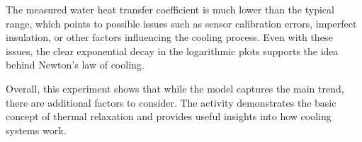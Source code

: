 \documentclass[12pt,a4paper]{report}
\begin{document}
The measured water heat transfer coefficient is much lower than the typical range, which points to possible issues such as sensor calibration errors, imperfect insulation, or other factors influencing the cooling process. Even with these issues, the clear exponential decay in the logarithmic plots supports the idea behind Newton’s law of cooling.

Overall, this experiment shows that while the model captures the main trend, there are additional factors to consider. The activity demonstrates the basic concept of thermal relaxation and provides useful insights into how cooling systems work.
\end{document}

